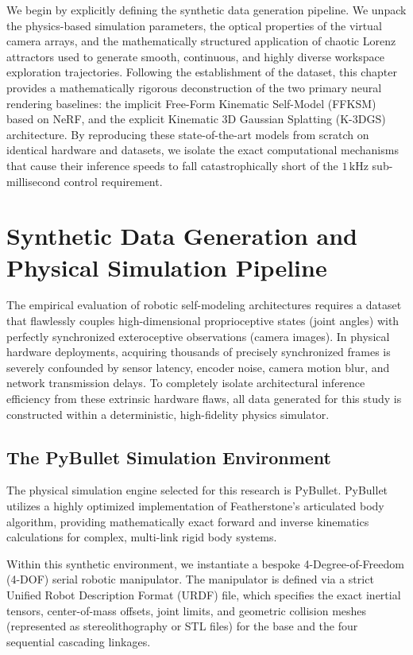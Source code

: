 \documentclass[12pt,a4paper,oneside]{report}
\begin{document}
We begin by explicitly defining the synthetic data generation pipeline. We unpack the physics-based simulation parameters, the optical properties of the virtual camera arrays, and the mathematically structured application of chaotic Lorenz attractors used to generate smooth, continuous, and highly diverse workspace exploration trajectories. Following the establishment of the dataset, this chapter provides a mathematically rigorous deconstruction of the two primary neural rendering baselines: the implicit Free-Form Kinematic Self-Model (FFKSM) based on NeRF, and the explicit Kinematic 3D Gaussian Splatting (K-3DGS) architecture. By reproducing these state-of-the-art models from scratch on identical hardware and datasets, we isolate the exact computational mechanisms that cause their inference speeds to fall catastrophically short of the $1\,\mathrm{kHz}$ sub-millisecond control requirement.

\section{Synthetic Data Generation and Physical Simulation Pipeline}

The empirical evaluation of robotic self-modeling architectures requires a dataset that flawlessly couples high-dimensional proprioceptive states (joint angles) with perfectly synchronized exteroceptive observations (camera images). In physical hardware deployments, acquiring thousands of precisely synchronized frames is severely confounded by sensor latency, encoder noise, camera motion blur, and network transmission delays. To completely isolate architectural inference efficiency from these extrinsic hardware flaws, all data generated for this study is constructed within a deterministic, high-fidelity physics simulator.

\subsection{The PyBullet Simulation Environment}

The physical simulation engine selected for this research is PyBullet. PyBullet utilizes a highly optimized implementation of Featherstone’s articulated body algorithm, providing mathematically exact forward and inverse kinematics calculations for complex, multi-link rigid body systems. 

Within this synthetic environment, we instantiate a bespoke 4-Degree-of-Freedom (4-DOF) serial robotic manipulator. The manipulator is defined via a strict Unified Robot Description Format (URDF) file, which specifies the exact inertial tensors, center-of-mass offsets, joint limits, and geometric collision meshes (represented as stereolithography or STL files) for the base and the four sequential cascading linkages. 
\end{document}
